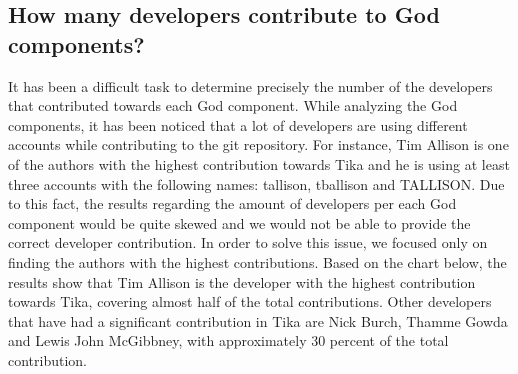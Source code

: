 \documentclass{article}
\begin{document}
\subsection{How many developers contribute to God components?}


It has been a difficult task to determine precisely the number of the developers that contributed towards each God component. While analyzing the God components, it has been noticed that a lot of developers are using different accounts while contributing to the git repository. For instance, Tim Allison is one of the authors with the highest contribution towards Tika and he is using at least three accounts with the following names: tallison, tballison and TALLISON. Due to this fact, the results regarding the amount of developers per each God component would be quite skewed and we would not be able to provide the correct developer contribution. In order to solve this issue, we focused only on finding the authors with the highest contributions. Based on the chart below, the results show that Tim Allison is the developer with the highest contribution towards Tika, covering almost half of the total contributions. Other developers that have had a significant contribution in Tika are Nick Burch, Thamme Gowda and Lewis John McGibbney, with approximately 30 percent of the total contribution. 
\end{document}
